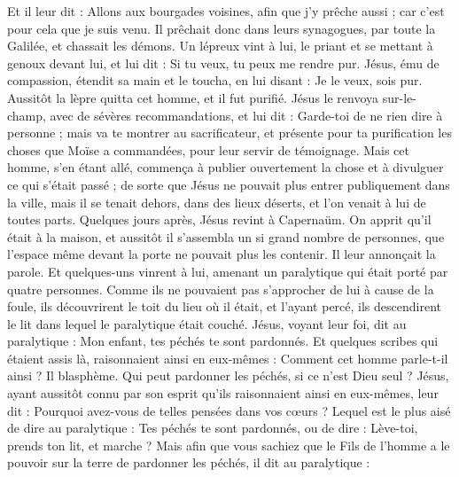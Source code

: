\begin{multicols}{2}
Et il leur dit : Allons aux bourgades voisines, afin que j'y prêche aussi ; car c’est pour cela que je suis venu.
Il prêchait donc dans leurs synagogues, par toute la Galilée, et chassait les démons.
Un lépreux vint à lui, le priant et se mettant à genoux devant lui, et lui dit : Si tu veux, tu peux me rendre pur.
Jésus, ému de compassion, étendit sa main et le toucha, en lui disant : Je le veux, sois pur.
Aussitôt la lèpre quitta cet homme, et il fut purifié.
Jésus le renvoya sur-le-champ, avec de sévères recommandations,
et lui dit : Garde-toi de ne rien dire à personne ; mais va te montrer au sacrificateur, et présente pour ta purification les choses que Moïse a commandées, pour leur servir de témoignage{}.
Mais cet homme, s’en étant allé, commença à publier ouvertement la chose et à divulguer ce qui s'était passé ; de sorte que Jésus ne pouvait plus entrer publiquement dans la ville, mais il se tenait dehors, dans des lieux déserts, et l’on venait à lui de toutes parts.
\VerseOne{}Quelques jours après, Jésus revint à Capernaüm. On apprit qu'il était à la maison,
et aussitôt il s’assembla un si grand nombre de personnes, que l'espace même devant la porte ne pouvait plus les contenir. Il leur annonçait la parole.
Et quelques-uns vinrent à lui, amenant un paralytique qui était porté par quatre personnes.
Comme ils ne pouvaient pas s’approcher de lui à cause de la foule, ils découvrirent le toit du lieu où il était, et l'ayant percé, ils descendirent le lit dans lequel le paralytique était couché.
Jésus, voyant leur foi, dit au paralytique : Mon enfant, tes péchés te sont pardonnés.
Et quelques scribes qui étaient assis là, raisonnaient ainsi en eux-mêmes :
Comment cet homme parle-t-il ainsi ? Il blasphème. Qui peut pardonner les péchés, si ce n’est Dieu seul ?
Jésus, ayant aussitôt connu par son esprit qu'ils raisonnaient ainsi en eux-mêmes, leur dit : Pourquoi avez-vous de telles pensées dans vos cœurs ?
Lequel est le plus aisé de dire au paralytique : Tes péchés te sont pardonnés, ou de dire : Lève-toi, prends ton lit, et marche ?
Mais afin que vous sachiez que le Fils de l'homme a le pouvoir sur la terre de pardonner les péchés, il dit au paralytique :

\end{multicols}
